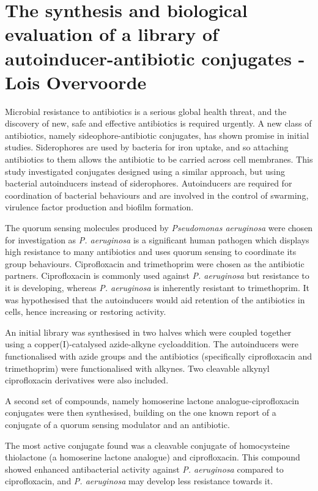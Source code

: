 \documentclass[10pt,a4paper]{article}
\begin{document}
\section*{The synthesis and biological evaluation of a library of autoinducer-antibiotic conjugates - Lois Overvoorde}

Microbial resistance to antibiotics is a serious global health threat, and the discovery of new, safe and effective antibiotics is required urgently. A new class of antibiotics, namely sideophore-antibiotic conjugates, has shown promise in initial studies. Siderophores are used by bacteria for iron uptake, and so attaching antibiotics to them allows the antibiotic to be carried across cell membranes. This study investigated conjugates designed using a similar approach, but using bacterial autoinducers instead of siderophores. Autoinducers are required for coordination of bacterial behaviours and are involved in the control of swarming, virulence factor production and biofilm formation. 

The quorum sensing molecules produced by \textit{Pseudomonas aeruginosa} were chosen for investigation as \textit{P. aeruginosa} is a significant human pathogen which displays high resistance to many antibiotics and uses quorum sensing to coordinate its group behaviours. 
Ciprofloxacin and trimethoprim were chosen as the antibiotic partners.
Ciprofloxacin is commonly used against \textit{P. aeruginosa} but resistance to it is developing, whereas \textit{P. aeruginosa} is inherently resistant to trimethoprim.
It was hypothesised that the autoinducers would aid retention of the antibiotics in cells, hence increasing or restoring activity.

An initial library was synthesised in two halves which were coupled together using a copper(I)-catalysed azide-alkyne cycloaddition. 
The autoinducers were functionalised with azide groups and the antibiotics (specifically ciprofloxacin and trimethoprim) were functionalised with alkynes. 
Two cleavable alkynyl ciprofloxacin derivatives were also included.

A second set of compounds, namely homoserine lactone analogue-ciprofloxacin conjugates were then synthesised, building on the one known report of a conjugate of a quorum sensing modulator and an antibiotic.

The most active conjugate found was a cleavable conjugate of homocysteine thiolactone (a homoserine lactone analogue) and ciprofloxacin. This compound showed enhanced antibacterial activity against \textit{P. aeruginosa} compared to ciprofloxacin, and \textit{P. aeruginosa} may develop less resistance towards it.
	
\end{document}
